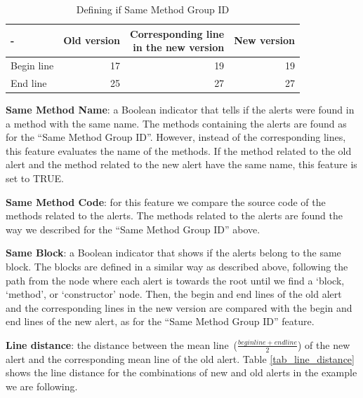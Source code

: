 \documentclass[
]{article}
\begin{document}
\normalsize

\small

\begin{table}[H]

\caption{\label{tab:unnamed-chunk-11}Defining if Same Method Group ID \label{tab_same_method_2}}
\centering
\begin{tabular}[t]{l|r|r|r}
\hline
- & Old version & \makecell[l]{Corresponding line\\in the new version} & New version\\
\hline
Begin line & 17 & 19 & 19\\
\hline
End line & 25 & 27 & 27\\
\hline
\end{tabular}
\end{table}

\normalsize

\noindent \textbf{Same Method Name}: a Boolean indicator that tells if
the alerts were found in a method with the same name. The methods containing
the alerts are found as for the ``Same Method Group ID''. However,
instead of the corresponding lines, this feature evaluates the name of
the methods. If the method related to the old alert and the method
related to the new alert have the same name, this feature is set to TRUE.

\noindent \textbf{Same Method Code}: for this feature we compare the
source code of the methods related to the alerts. The methods related to
the alerts are found the way we described for the ``Same Method Group
ID'' above.

%
%
\noindent \textbf{Same Block}: a Boolean indicator that shows if the
alerts belong to the same block. The blocks are defined in a similar way
as described above, following the path from the node where each alert is
towards the root until we find a `block, `method', or `constructor' node.
Then, the begin and end lines of the old alert and the corresponding lines
in the new version are compared with the begin and end lines of the new
alert, as for the ``Same Method Group ID'' feature.

\noindent \textbf{Line distance}: the distance between the
mean line\ ($\frac{beginline + endline}{2}$) of the new alert 
and the corresponding mean line of the old alert. Table 
\ref{tab_line_distance} shows the line distance for the 
combinations of new and old alerts in the example we are 
following.

%
%
\end{document}
